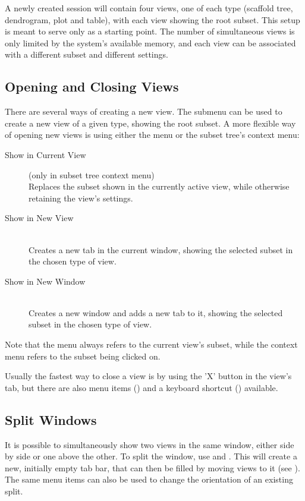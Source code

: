 A newly created \sh session will contain four views, one of each type (scaffold tree, dendrogram, plot and table), with each view showing the root subset.
This setup is meant to serve only as a starting point.
The number of simultaneous views is only limited by the system's available memory, and each view can be associated with a different subset and different settings.


\subsection{Opening and Closing Views}

There are several ways of creating a new view.
The  submenu can be used to create a new view of a given type, showing the root subset.
A more flexible way of opening new views is using either the  menu or the subset tree's context menu:

\begin{description}
    \item[Show in Current View] (only in subset tree context menu) \hfill \\
    Replaces the subset shown in the currently active view, while otherwise retaining the view's settings.
    \item[Show in New View] \hfill \\
    Creates a new tab in the current window, showing the selected subset in the chosen type of view.
    \item[Show in New Window] \hfill \\
    Creates a new window and adds a new tab to it, showing the selected subset in the chosen type of view.
\end{description}

\noindent Note that the  menu always refers to the current view's subset, while the context menu refers to the subset being clicked on.

Usually the fastest way to close a view is by using the 'X' button in the view's tab, but there are also menu items () and a keyboard shortcut () available.


\subsection{Split Windows}

It is possible to simultaneously show two views in the same window, either side by side or one above the other.
To split the window, use  and .
This will create a new, initially empty tab bar, that can then be filled by moving views to it (see ).
The same menu items can also be used to change the orientation of an existing split.

